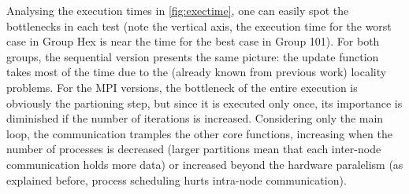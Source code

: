 Analysing the execution times in \cref{fig:exectime}, one can easily spot the bottlenecks in each test (note the vertical axis, the execution time for the worst case in Group Hex is near the time for the best case in Group 101). For both groups, the sequential version presents the same picture: the update function takes most of the time due to the (already known from previous work) locality problems. For the MPI versions, the bottleneck of the entire execution is obviously the partioning step, but since it is executed only once, its importance is diminished if the number of iterations is increased. Considering only the main loop, the communication tramples the other core functions, increasing when the number of processes is decreased (larger partitions mean that each inter-node communication holds more data) or increased beyond the hardware paralelism (as explained before, process scheduling hurts intra-node communication).

